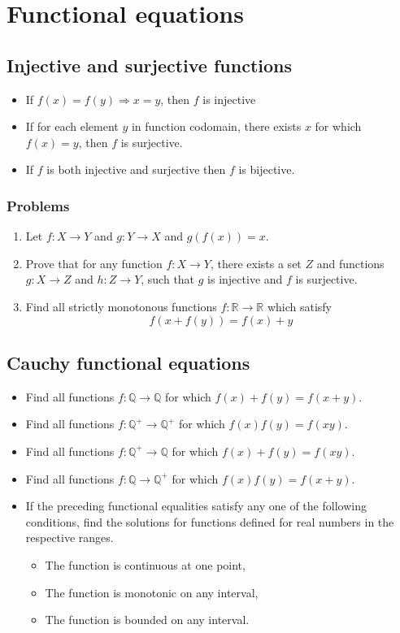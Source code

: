 \documentclass{article}
\begin{document}
\section*{Functional equations}

\subsection{Injective and surjective functions}
	\begin{itemize}
		\item 
		If $f(x)=f(y) \Rightarrow x=y$, then $f$ is injective
		\item 
		If for each element $y$ in function codomain, there exists $x$ for which $f(x)=y$, then $f$ is surjective.
		\item
		If $f$ is both injective and surjective then $f$ is bijective.
	\end{itemize}

	\subsubsection*{Problems}
		\begin{enumerate}
			\item
			Let $f: X \to Y$ and $g: Y \to X$ and $g(f(x))=x$. 
			\item 
			Prove that for any function $f: X \to Y$, there exists a set $Z$ and functions $g: X \to Z$ and $h: Z\to Y$, such that $g$ is injective and $f$ is surjective.
			\item 
			Find all strictly monotonous functions $f: \mathbb{R} \to \mathbb{R}$ which satisfy 
			$$f(x + f(y)) = f(x) + y$$
		\end{enumerate}

	\subsection{Cauchy functional equations}
		\begin{itemize}
			\item
			Find all functions $f: \mathbb{Q} \to \mathbb{Q}$ for which $f(x)+f(y)=f(x+y)$.
			\item
			Find all functions $f: \mathbb{Q^+} \to \mathbb{Q^+}$ for which $f(x)f(y)=f(xy)$.
			\item
			Find all functions $f: \mathbb{Q^+} \to \mathbb{Q}$ for which $f(x)+f(y)=f(xy)$.
			\item
			Find all functions $f: \mathbb{Q} \to \mathbb{Q^+}$ for which $f(x)f(y)=f(x+y)$.
			\item 
			If the preceding functional equalities satisfy any one of the following conditions, find the solutions for functions defined for real numbers in the respective ranges.
			\begin{itemize}
				\item The function is continuous at one point,
				\item The function is monotonic on any interval,
				\item The function is bounded on any interval.
			\end{itemize}
		\end{itemize}
\end{document}
